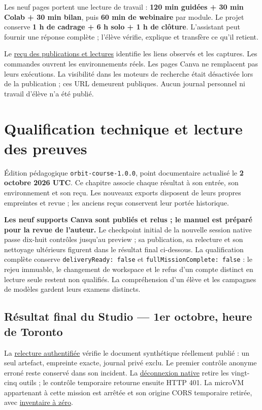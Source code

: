 \documentclass[
  canadien,
  11pt,
  a4paper,
]{report}
\begin{document}
Les neuf pages portent une lecture de travail : \textbf{120 min guidées
+ 30 min Colab + 30 min bilan}, puis \textbf{60 min de webinaire} par
module. Le projet conserve \textbf{1 h de cadrage + 6 h solo + 1 h de
clôture}. L'assistant peut fournir une réponse complète ; l'élève
vérifie, explique et transfère ce qu'il retient.

Le \href{../CANVA_DELIVERY.json}{reçu des publications et lectures}
identifie les liens observés et les captures. Les commandes ouvrent les
environnements réels. Les pages Canva ne remplacent pas leurs
exécutions. La visibilité dans les moteurs de recherche était désactivée
lors de la publication ; ces URL demeurent publiques. Aucun journal
personnel ni travail d'élève n'a été publié.

\chapter{Qualification technique et lecture des
preuves}\label{qualification-technique-et-lecture-des-preuves}

Édition pédagogique \texttt{orbit-course-1.0.0}, point documentaire
actualisé le \textbf{2 octobre 2026 UTC}. Ce chapitre associe chaque
résultat à son entrée, son environnement et son reçu. Les nouveaux
exports disposent de leurs propres empreintes et revue ; les anciens
reçus conservent leur portée historique.

\textbf{Les neuf supports Canva sont publiés et relus ; le manuel est
préparé pour la revue de l'auteur.} Le checkpoint initial de la nouvelle
session native passe dix-huit contrôles jusqu'au preview ; sa
publication, sa relecture et son nettoyage ultérieurs figurent dans le
résultat final ci-dessous. La qualification complète conserve
\texttt{delivery\allowbreak{}Ready:\ false} et \texttt{full\allowbreak{}Mission\allowbreak{}Complete:\ false} :
le rejeu immuable, le changement de workspace et le refus d'un compte
distinct en lecture seule restent non qualifiés. La compréhension d'un
élève et les campagnes de modèles gardent leurs examens distincts.

\section{Résultat final du Studio --- 1er octobre, heure de
Toronto}\label{ruxe9sultat-final-du-studio-1er-octobre-heure-de-toronto}

La
\href{../../../../receipts/formation/native-studio-publication-recovery-20261002.json}{relecture
authentifiée} vérifie le document synthétique réellement publié : un
seul artefact, empreinte exacte, journal privé exclu. Le premier
contrôle anonyme erroné reste conservé dans son incident. La
\href{../../../../receipts/formation/native-studio-logout-20261002.json}{déconnexion
native} retire les vingt-cinq outils ; le contrôle temporaire retourne
ensuite HTTP 401. La microVM appartenant à cette mission est arrêtée et
son origine CORS temporaire retirée, avec
\href{../../../../receipts/formation/native-studio-final-cleanup-20261002.json}{inventaire
à zéro}.
\end{document}
